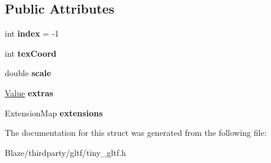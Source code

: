 \subsection*{Public Attributes}
\begin{DoxyCompactItemize}
\item 
\mbox{\label{structtinygltf_1_1NormalTextureInfo_a9fcc219dbb5ef89b732c3ec85c273f25}} 
int {\bfseries index} = -\/1
\item 
\mbox{\label{structtinygltf_1_1NormalTextureInfo_a2e94abe9030a327decfbb6218f1bdac8}} 
int {\bfseries tex\+Coord}
\item 
\mbox{\label{structtinygltf_1_1NormalTextureInfo_a5fffb036e0444f2cd57186acbbe11b67}} 
double {\bfseries scale}
\item 
\mbox{\label{structtinygltf_1_1NormalTextureInfo_a0fab6ab7527d64fde60a1e42f264669d}} 
\hyperlink{classtinygltf_1_1Value}{Value} {\bfseries extras}
\item 
\mbox{\label{structtinygltf_1_1NormalTextureInfo_a0bab4749f87de8c61de38e9929a0974b}} 
Extension\+Map {\bfseries extensions}
\end{DoxyCompactItemize}


The documentation for this struct was generated from the following file\+:\begin{DoxyCompactItemize}
\item 
Blaze/thirdparty/gltf/tiny\+\_\+gltf.\+h\end{DoxyCompactItemize}
